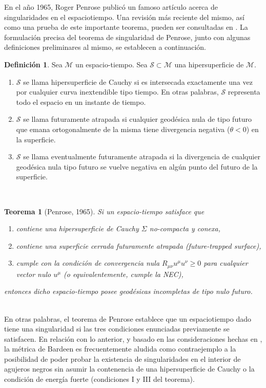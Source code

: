 \documentclass[16pt,a4paper]{article}
\numberwithin{equation}{section}
\newtheorem{theorem}{Teorema}[section]
\theoremstyle{definition}
\newtheorem{definition}{Definición}[section]
\begin{document}
En el año 1965, Roger Penrose publicó un famoso artículo \cite{penrose} acerca de singularidades en el espaciotiempo. Una revisión más reciente del mismo, así como una prueba de este importante teorema, pueden ser consultadas en \cite{senovilla2015}. La formulación precisa del teorema de singularidad de Penrose, junto con algunas definiciones preliminares al mismo, se establecen a continuación. \\
\theoremstyle{definition}
\begin{definition}
\label{trapped surfaces}
	Sea $\mathcal{M}$ un espacio-tiempo. Sea $\mathcal{S} \subset \mathcal{M}$ una hipersuperficie de $\mathcal{M}$.
	\begin{enumerate}[i]
		\item $\mathcal{S}$ se llama hipersuperficie de Cauchy si es intersecada exactamente una vez por cualquier curva inextendible tipo tiempo. En otras palabras, $\mathcal{S}$ representa todo el espacio en un instante de tiempo. 
		
		\item $\mathcal{S}$ se llama futuramente atrapada si cualquier geodésica nula de tipo futuro que emana ortogonalmente de la misma tiene divergencia negativa ($\theta < 0$) en la superficie.
		
		\item $\mathcal{S}$ se llama eventualmente futuramente atrapada si la divergencia de cualquier geodésica nula tipo futuro se vuelve negativa en algún punto del futuro de la superficie.
	\end{enumerate}
\end{definition}
\
\begin{theorem}[Penrose, 1965]
\label{penrose sing thm}
Si un espacio-tiempo satisface que
\begin{enumerate}[i]
\item contiene una hipersuperficie de Cauchy $\Sigma$ no-compacta y conexa,

\item contiene una superficie cerrada futuramente atrapada (future-trapped surface),

\item cumple con la condición de convergencia nula $R_{\mu \nu}u^{\mu}u^{\nu} \geq 0$ para cualquier vector nulo $u^{\mu}$ (o equivalentemente, cumple la NEC),
\end{enumerate}

entonces dicho espacio-tiempo posee geodésicas incompletas de tipo nulo futuro.
\end{theorem}
\
\\
En otras palabras, el teorema de Penrose establece que un espaciotiempo dado tiene una singularidad si las tres condiciones enunciadas previamente se satisfacen. En relación con lo anterior, y basado en las consideraciones hechas en \cite{borde1994,borde1996}, la métrica de Bardeen es frecuentemente aludida como contraejemplo a la posibilidad de poder probar la existencia de singularidades en el interior de agujeros negros sin asumir la contenencia de una hipersuperficie de Cauchy o la condición de energía fuerte (condiciones I y III del teorema).\\
\end{document}
